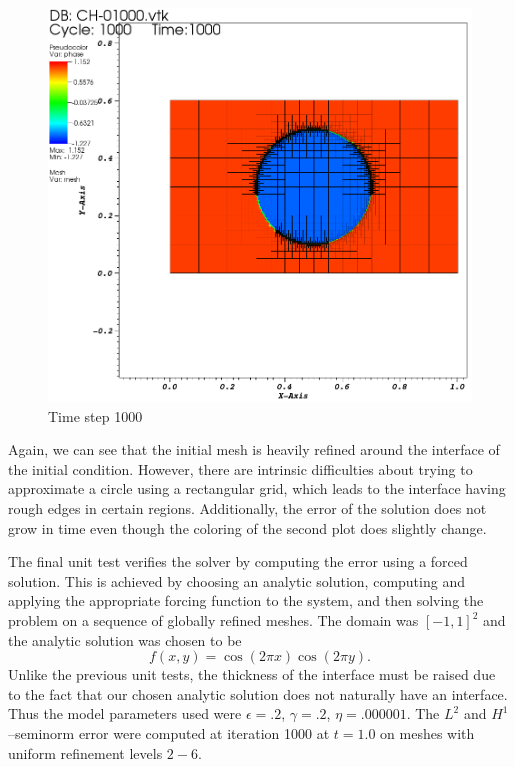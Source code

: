 \documentclass[11pt,fullpage]{article}
\newcommand{\eps}{\epsilon}
\theoremstyle{lemma}
\theoremstyle{definition}
\theoremstyle{lemma}
\begin{document}
\begin{figure}[ht!]
\begin{minipage}{.4\paperwidth}
		\includegraphics[scale=.9]{CHBall2.png}
		\\Time step 1000
	\end{minipage}
\end{figure}
Again, we can see that the initial mesh is heavily refined around the interface of the initial condition. However, there are intrinsic difficulties about trying to approximate a circle using a rectangular grid, which leads to the interface having rough edges in certain regions. Additionally, the error of the solution does not grow in time even though the coloring of the second plot does slightly change.

The final unit test verifies the solver by computing the error using a forced solution. This is achieved by choosing an analytic solution, computing and applying the appropriate forcing function to the system, and then solving the problem on a sequence of globally refined meshes. The domain was $[-1,1]^2$ and the analytic solution was chosen to be
$$
	f(x,y) = \cos(2\pi x)\cos(2\pi y).
$$
Unlike the previous unit tests, the thickness of the interface must be raised due to the fact that our chosen analytic solution does not naturally have an interface. Thus the model parameters used were $\eps = .2$, $\gamma = .2$, $\eta = .000001$. The $L^2$ and $H^1$--seminorm error were computed at iteration 1000 at $t=1.0$ on meshes with uniform refinement levels $2-6$.
\end{document}
